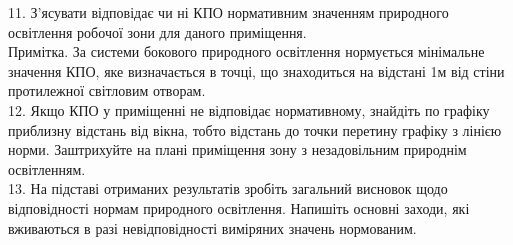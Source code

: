 \documentclass[a4paper,14pt]{extreport}
\begin{document}
11. З’ясувати відповідає чи ні КПО нормативним значенням природного освітлення робочої зони для даного приміщення.\\
Примітка. За системи бокового природного освітлення нормується мінімальне значення КПО, яке визначається в точці, що знаходиться на відстані 1м від стіни протилежної світловим отворам.\\

12. Якщо КПО у приміщенні не відповідає нормативному, знайдіть по графіку приблизну відстань від вікна, тобто відстань до точки перетину графіку з лінією норми. Заштрихуйте на плані приміщення зону з незадовільним природнім освітленням.\\

13. На підставі отриманих результатів зробіть загальний висновок щодо відповідності нормам природного освітлення. Напишіть основні заходи, які вживаються в  разі невідповідності виміряних значень нормованим.


\par
\end{document}
